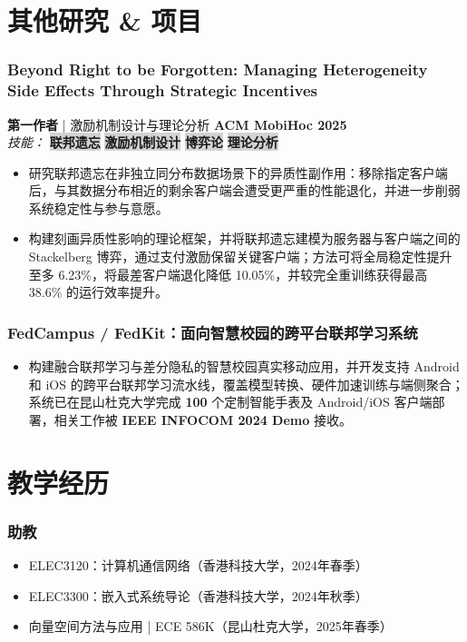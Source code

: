 \documentclass[10pt,a4paper]{article}
\newcommand{\skills}[1]{%
    \noindent\textit{\color{graytext}技能：}%
    \begingroup
    #1%
    \endgroup
}
\newcommand{\skilltag}[1]{%
    \setlength{\fboxsep}{3pt}%
    \setlength{\fboxrule}{0.5pt}%
    \colorbox{lightgray}{\color{itemcolor}\small\textbf{#1}}%
    \hspace{0.3em}%
}
\begin{document}
\section*{\color{sectioncolor}其他研究 \& 项目}
    \subsubsection*{\color{itemcolor}Beyond Right to be Forgotten: Managing Heterogeneity Side Effects Through Strategic Incentives}
    \noindent\textbf{\color{sectioncolor}第一作者} | 激励机制设计与理论分析 \hfill \color{accentcolor}\textbf{ACM MobiHoc 2025} \\
    \skills{\skilltag{联邦遗忘} \skilltag{激励机制设计} \skilltag{博弈论} \skilltag{理论分析}} 
    \begin{itemize}[leftmargin=*, label=\textcolor{accentcolor}{\textbullet}, itemsep=0.2em]
        \item 研究联邦遗忘在非独立同分布数据场景下的异质性副作用：移除指定客户端后，与其数据分布相近的剩余客户端会遭受更严重的性能退化，并进一步削弱系统稳定性与参与意愿。
        \item 构建刻画异质性影响的理论框架，并将联邦遗忘建模为服务器与客户端之间的 Stackelberg 博弈，通过支付激励保留关键客户端；方法可将全局稳定性提升至多 6.23\%，将最差客户端退化降低 10.05\%，并较完全重训练获得最高 38.6\% 的运行效率提升。
    \end{itemize}
    \subsubsection*{\color{itemcolor}FedCampus / FedKit：面向智慧校园的跨平台联邦学习系统}
    \begin{itemize}[leftmargin=*, label=\textcolor{accentcolor}{\textbullet}, itemsep=0.2em]
        \item 构建融合联邦学习与差分隐私的智慧校园真实移动应用，并开发支持 Android 和 iOS 的跨平台联邦学习流水线，覆盖模型转换、硬件加速训练与端侧聚合；系统已在昆山杜克大学完成 \textbf{100} 个定制智能手表及 Android/iOS 客户端部署，相关工作被 \textbf{IEEE INFOCOM 2024 Demo} 接收。
    \end{itemize}

\section*{\color{sectioncolor}教学经历}
    \subsubsection*{\color{itemcolor}助教}
    \begin{itemize}[leftmargin=*, label=\textcolor{accentcolor}{\textbullet}]
        \item ELEC3120：计算机通信网络（香港科技大学，2024年春季）
        \item ELEC3300：嵌入式系统导论（香港科技大学，2024年秋季）
        \item 向量空间方法与应用 | ECE 586K（昆山杜克大学，2025年春季）
    \end{itemize}
\end{document}
